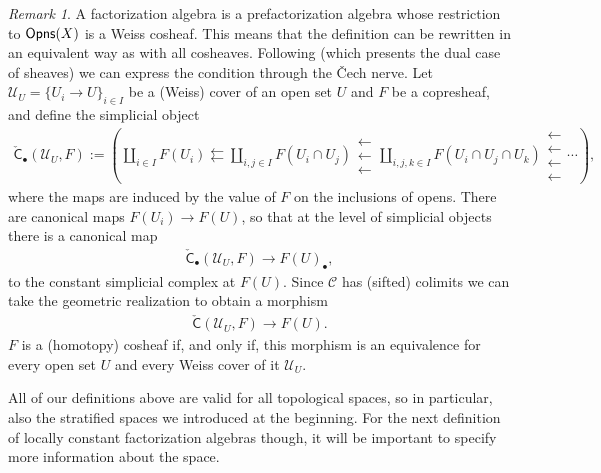 \documentclass[12pt,a4paper]{article}
\newcounter{counter} \numberwithin{counter}{section}
\theoremstyle{definition}
\theoremstyle{plain}
\theoremstyle{remark}
\newtheorem{remark}[counter]{Remark}
\newcommand{\catC}{\mathscr{C}}
\newcommand{\opens}[1][s]{%
    \ifx r#1\mathsf{Opns}\else
    \ifx s#1\mathscr{O} \mathsf{pns}\else
    \mathrm{Illegal~option}%
    \fi\fi
}
\newcommand{\cech}{\check{\mathsf{C}}}
\begin{document}
\begin{remark}
    A factorization algebra is a prefactorization algebra whose restriction to $\opens[r](X)$ is a Weiss cosheaf. This means that the definition can be rewritten in an equivalent way as with all cosheaves. Following \cite{nlab} (which presents the dual case of sheaves) we can express the condition through the \v{C}ech nerve. Let $\mathscr{U}_U = \{ U_i \rightarrow U\}_{i \in I}$ be a (Weiss) cover of an open set $U$ and $F$ be a copresheaf, and define the simplicial object
    \begin{align}
        \cech_{\bullet}(\mathscr{U}_U, F) := \left( \coprod_{i \in I} F(U_i) \leftleftarrows \coprod_{i, j \in I} F(U_i \cap U_j) \mathrel{\substack{\textstyle\leftarrow\\[-0.6ex]
        \textstyle\leftarrow\\[-0.6ex]\textstyle\leftarrow}} \coprod_{i, j, k \in I} F(U_i \cap U_j \cap U_k) \mathrel{\substack{\textstyle\leftarrow\\[-0.6ex]\textstyle\leftarrow\\[-0.6ex]\textstyle\leftarrow\\[-0.6ex]\textstyle\leftarrow}} \cdots  \right),
    \end{align}
    where the maps are induced by the value of $F$ on the inclusions of opens. There are canonical maps $F(U_i) \rightarrow F(U)$, so that at the level of simplicial objects there is a canonical map
    \begin{align}
        \cech_{\bullet} (\mathscr{U}_U, F) \xrightarrow{\quad} F(U)_{\bullet},
    \end{align}
    to the constant simplicial complex at $F(U)$. Since $\catC$ has (sifted) colimits we can take the geometric realization to obtain a morphism
    \begin{align}
        \cech(\mathscr{U}_U, F) \xrightarrow{\quad} F(U).
    \end{align}
    $F$ is a (homotopy) cosheaf if, and only if, this morphism is an equivalence for every open set $U$ and every Weiss cover of it $\mathscr{U}_U$.
\end{remark}

All of our definitions above are valid for all topological spaces, so in particular, also the stratified spaces we introduced at the beginning. For the next definition of locally constant factorization algebras though, it will be important to specify more information about the space.
\end{document}
